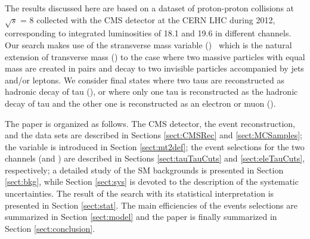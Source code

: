 The results discussed here are based on a dataset of proton-proton 
collisions at $\sqrt{s}$ = 8\TeV
collected with the CMS detector at the CERN LHC during 2012, corresponding to integrated
luminosities of 18.1 and 19.6 \invfb in different channels. 
Our search makes use of the stransverse mass variable (\mttwo)~\cite{Lester:1999tx,Barr:2003rg}
which is the natural extension of transverse mass (\mt) to the case 
where two massive particles with equal mass are created in pairs and decay 
to two invisible particles accompanied by jets and/or leptons.  We consider final states where
two taus are reconstructed as hadronic decay of tau (\tauTau), or where only one tau is reconstructed as the hadronic decay of tau and the
other one is reconstructed as an electron or muon (\leptonTau).

The paper is organized as follows.  The CMS detector, the event reconstruction, and the data sets are described
in Sections \ref{sect:CMSRec} and \ref{sect:MCSamples}; the \mttwo variable is introduced in Section \ref{sect:mt2def}; 
the event selections for the two channels (\tauTau and \leptonTau)
are described in Sections \ref{sect:tauTauCuts} and \ref{sect:eleTauCuts}, respectively;
a detailed study of the SM backgrounds is presented in Section \ref{sect:bkg}, while Section \ref{sect:sys} 
is devoted to the description of the systematic uncertainties.  The result of the search with its statistical interpretation is presented in 
Section \ref{sect:stat}. The main efficiencies of the events selections are summarized in Section \ref{sect:model} and the paper is finally summarized in Section \ref{sect:conclusion}.





